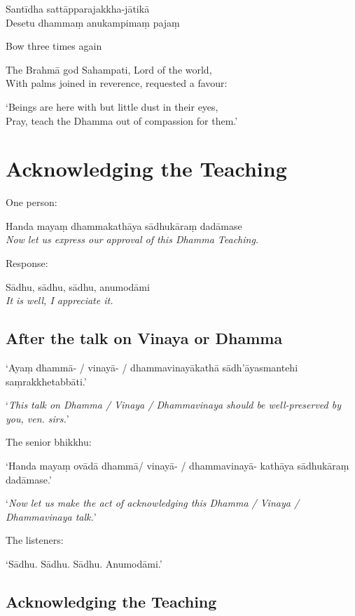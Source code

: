 Santīdha sattāpparajakkha-jātikā\\
Desetu dhammaṃ anukampimaṃ pajaṃ

\begin{instruction}
  Bow three times again
\end{instruction}

\begin{english}
The Brahmā god Sahampati, Lord of the world,\\
With palms joined in reverence, requested a favour:

`Beings are here with but little dust in their eyes,\\
Pray, teach the Dhamma out of compassion for them.' 
\end{english}

\section{Acknowledging the Teaching}

One person:

Handa mayaṃ dhammakathāya sādhukāraṃ dadāmase\\
\emph{Now let us express our approval of this Dhamma Teaching.}

Response:

Sādhu, sādhu, sādhu, anumodāmi\\
\emph{It is well, I appreciate it.}

\subsection{After the talk on Vinaya or Dhamma}

‘Ayaṃ dhammā- / vinayā- / dhammavinayākathā sādh'āyasmantehi saṃrakkhetabbāti.’

‘\emph{This talk on Dhamma / Vinaya / Dhammavinaya should be well-preserved by you, ven. sirs.}’

The senior bhikkhu:

‘Handa mayaṃ ovādā dhammā/ vinayā- / dhammavinayā- kathāya sādhukāraṃ dadāmase.’

‘\emph{Now let us make the act of acknowledging this Dhamma / Vinaya / Dhammavinaya talk.}’

The listeners:

‘Sādhu. Sādhu. Sādhu. Anumodāmi.’

\subsection{Acknowledging the Teaching}

